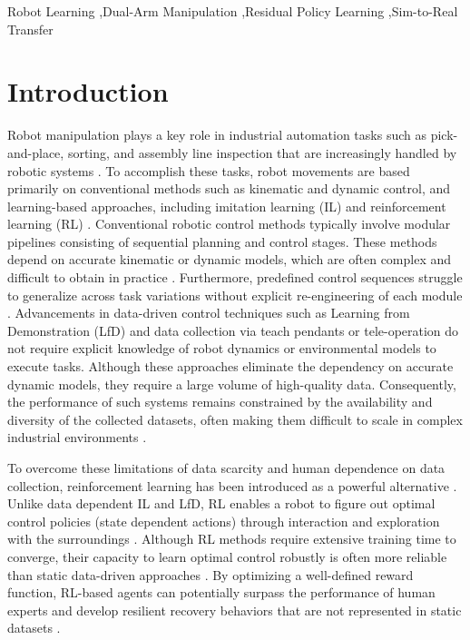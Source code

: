 \documentclass[a4paper,fleqn]{cas-dc}
\begin{document}
\begin{keywords}
Robot Learning \sep Dual-Arm Manipulation \sep Residual Policy Learning \sep Sim-to-Real Transfer
\end{keywords}


\maketitle

\section{Introduction}
\label{intro}
Robot manipulation plays a key role in industrial automation tasks such as pick-and-place, sorting, and assembly line inspection that are increasingly handled by robotic systems \cite{intro-2}. To accomplish these tasks, robot movements are based primarily on conventional methods such as kinematic and dynamic control, and learning-based approaches, including imitation learning (IL) and reinforcement learning (RL) \cite{intro-3}. Conventional robotic control methods typically involve modular pipelines consisting of sequential planning and control stages. These methods depend on accurate kinematic or dynamic models, which are often complex and difficult to obtain in practice \cite{trajec_conv}. Furthermore, predefined control sequences struggle to generalize across task variations without explicit re-engineering of each module \cite{intro-1}. Advancements in data-driven control techniques such as Learning from Demonstration (LfD) and data collection via teach pendants or tele-operation do not require explicit knowledge of robot dynamics or environmental models to execute tasks. Although these approaches eliminate the dependency on accurate dynamic models, they require a large volume of high-quality data. Consequently, the performance of such systems remains constrained by the availability and diversity of the collected datasets, often making them difficult to scale in complex industrial environments \cite{intro-6}.

To overcome these limitations of data scarcity and human dependence on data collection, reinforcement learning has been introduced as a powerful alternative \cite{intro-8, liu2026review}. Unlike data dependent IL and LfD, RL enables a robot to figure out optimal control policies (state dependent actions) through interaction and exploration with the surroundings \cite{intro-7}. Although RL methods require extensive training time to converge, their capacity to learn optimal control robustly is often more reliable than static data-driven approaches \cite{intro-10}. By optimizing a well-defined reward function, RL-based agents can potentially surpass the performance of human experts and develop resilient recovery behaviors that are not represented in static datasets \cite{intro-9}.
\end{document}
